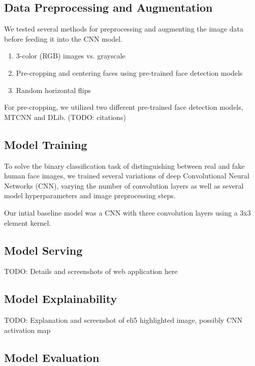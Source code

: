 \documentclass[11pt, letterpaper]{article}
\begin{document}
\begin{multicols}{2}
  \subsection{Data Preprocessing and Augmentation}

  We tested several methods for preprocessing and augmenting the image data before
  feeding it into the CNN model.

  \begin{enumerate}
  \item 3-color (RGB) images vs. grayscale
  \item Pre-cropping and centering faces using pre-trained face detection models
  \item Random horizontal flips
  \end{enumerate}

  For pre-cropping, we utilized two different pre-trained face detection models,
  MTCNN and DLib. (TODO: citations)

  \subsection{Model Training}

  To solve the binary classification task of distinguishing between real and fake
  human face images, we trained several variations of deep Convolutional
  Neural Networks (CNN), varying the number of convolution layers as well as several
  model hyperparameters and image preprocessing steps.

  Our intial baseline model was a CNN with three convolution layers using a 3x3 element kernel.

  \subsection{Model Serving}

  TODO: Details and screenshots of web application here

  \subsection{Model Explainability}

  TODO: Explanation and screenshot of eli5 highlighted image, possibly CNN activation map

  \subsection{Model Evaluation}


\end{multicols}
\end{document}
